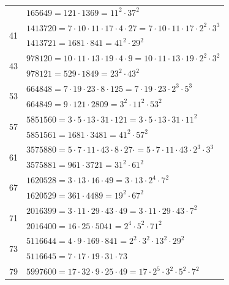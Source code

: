 \documentclass[11pt,letterpaper]{book}
\begin{document}
\begin{longtable}{ c l }
                          & $165649 = 121\cdot 1369 = 11^{2}\cdot 37^{2}$ \\ [1.0em]
\multirow{2}[2]{*}{\Huge 41} & $1413720 = 7\cdot 10\cdot 11\cdot 17\cdot 4\cdot 27 = 7\cdot 10\cdot 11\cdot 17\cdot 2^{2}\cdot 3^{3}$ \\
                          & $1413721 = 1681\cdot 841 = 41^{2}\cdot 29^{2}$ \\ [1.0em]
\multirow{2}[2]{*}{\Huge 43} & $978120 = 10\cdot 11\cdot 13\cdot 19\cdot 4\cdot 9 = 10\cdot 11\cdot 13\cdot 19\cdot 2^{2}\cdot 3^{2}$ \\
                          & $978121 = 529\cdot 1849 = 23^{2}\cdot 43^{2}$ \\ [1.0em]
\multirow{2}[2]{*}{\Huge 53} & $664848 = 7\cdot 19\cdot 23\cdot 8\cdot 125 = 7\cdot 19\cdot 23\cdot 2^{3}\cdot 5^{3}$ \\
                          & $664849 = 9\cdot 121\cdot 2809 = 3^{2}\cdot 11^{2}\cdot 53^{2}$ \\ [1.0em]
\multirow{2}[2]{*}{\Huge 57} & $5851560 = 3\cdot 5\cdot 13\cdot 31\cdot 121 = 3\cdot 5\cdot 13\cdot 31\cdot 11^{2}$ \\
                          & $5851561 = 1681\cdot 3481 = 41^{2}\cdot 57^{2}$ \\ [1.0em]
\multirow{2}[2]{*}{\Huge 61} & $3575880 = 5\cdot 7\cdot 11\cdot 43\cdot 8\cdot 27\cdot = 5\cdot 7\cdot 11\cdot 43\cdot 2^{3}\cdot 3^{3}$ \\
                          & $3575881 = 961\cdot 3721 = 31^{2}\cdot 61^{2}$ \\ [1.0em]
\multirow{2}[2]{*}{\Huge 67} & $1620528 = 3\cdot 13\cdot 16\cdot 49 = 3\cdot 13\cdot 2^{4}\cdot 7^{2}$ \\
                          & $1620529 = 361\cdot 4489 = 19^{2}\cdot 67^{2}$ \\ [1.0em]
\multirow{2}[2]{*}{\Huge 71} & $2016399 = 3\cdot 11\cdot 29\cdot 43\cdot 49 = 3\cdot 11\cdot 29\cdot 43\cdot 7^{2}$ \\
                          & $2016400 = 16\cdot 25\cdot 5041 = 2^{4}\cdot 5^{2}\cdot 71^{2}$ \\ [1.0em]
\multirow{2}[2]{*}{\Huge 73} & $5116644 = 4\cdot 9\cdot 169\cdot 841 = 2^{2}\cdot 3^{2}\cdot 13^{2}\cdot 29^{2}$ \\
                          & $5116645 = 7\cdot 17\cdot 19\cdot 31\cdot 73$ \\ [1.0em]
\multirow{2}[2]{*}{\Huge 79} & $5997600 = 17\cdot 32\cdot 9\cdot 25\cdot 49 = 17\cdot 2^{5}\cdot 3^{2}\cdot 5^{2}\cdot 7^{2}$ \\

\end{longtable}
\end{document}
